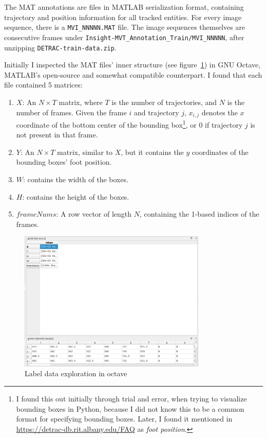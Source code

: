 The MAT annotations are files in MATLAB serialization format, containing trajectory and position information for all tracked entities. For every image sequence, there is a \verb|MVI_NNNNN.MAT| file.
The image sequences themselves are consecutive frames under \verb|Insight-MVT_Annotation_Train/MVI_NNNNN|, after unzipping \verb|DETRAC-train-data.zip|.

Initially I inspected the MAT files' inner structure (see figure~\ref{fig:octave-exploration}) in GNU Octave, MATLAB's open-source and somewhat compatible counterpart. I found that each file contained 5 matrices:
\begin{enumerate}
    \item{$X$: An $N \times T$ matrix, where $T$ is the number of trajectories, and $N$ is the number of frames. Given the frame $i$ and trajectory $j$, $x_{i,j}$ denotes the $x$ coordinate of the bottom center of the bounding box\footnote{I found this out initially through trial and error, when trying to visualize bounding boxes in Python, because I did not know this to be a common format for specifying bounding boxes. Later, I found it mentioned in \url{https://detrac-db.rit.albany.edu/FAQ} as \textit{foot position}.}, or $0$ if trajectory $j$ is not present in that frame.}
    \item{$Y$: An $N \times T$ matrix, similar to $X$, but it contains the $y$ coordinates of the bounding boxes' foot position.}
    \item{$W$: contains the width of the boxes.}
    \item{$H$: contains the height of the boxes.}
    \item{$frameNums$: A row vector of length $N$, containing the 1-based indices of the frames.}
\end{enumerate}

\begin{figure}[h]
    \begin{center}
        \captionsetup{width=0.8\textwidth}
        \includegraphics[width=0.8\textwidth]{figures/octave.png}
        \caption{Label data exploration in octave}
        \label{fig:octave-exploration}
    \end{center}
\end{figure}


